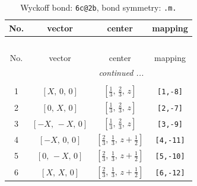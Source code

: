 \documentclass[fleqn,8pt]{jsarticle}
\begin{document}
\renewcommand{\arraystretch}{1.2}
\begin{longtable}{cccc}
\caption{Wyckoff bond: {\tt 6c@2b}, bond symmetry: {\tt .m.}}
 \\
 \hline \hline
No. & vector & center & mapping \\ \hline \endfirsthead

\multicolumn{3}{l}{\tablename\ \thetable{}} \\
 \hline \hline
No. & vector & center & mapping \\ \hline \endhead

 \hline \hline
\multicolumn{3}{r}{\footnotesize\it continued ...} \\ \endfoot

 \hline \hline
\multicolumn{3}{r}{} \\ \endlastfoot

1 & $\left[ X,\, 0,\, 0 \right]$ & $\left[ \frac{1}{3},\, \frac{2}{3},\, z \right]$ & {\tt [1,-8]} \\ \hline
2 & $\left[ 0,\, X,\, 0 \right]$ & $\left[ \frac{1}{3},\, \frac{2}{3},\, z \right]$ & {\tt [2,-7]} \\ \hline
3 & $\left[ - X,\, - X,\, 0 \right]$ & $\left[ \frac{1}{3},\, \frac{2}{3},\, z \right]$ & {\tt [3,-9]} \\ \hline
4 & $\left[ - X,\, 0,\, 0 \right]$ & $\left[ \frac{2}{3},\, \frac{1}{3},\, z + \frac{1}{2} \right]$ & {\tt [4,-11]} \\ \hline
5 & $\left[ 0,\, - X,\, 0 \right]$ & $\left[ \frac{2}{3},\, \frac{1}{3},\, z + \frac{1}{2} \right]$ & {\tt [5,-10]} \\ \hline
6 & $\left[ X,\, X,\, 0 \right]$ & $\left[ \frac{2}{3},\, \frac{1}{3},\, z + \frac{1}{2} \right]$ & {\tt [6,-12]} \\
\end{longtable}
\renewcommand{\arraystretch}{1.2}
\end{document}
